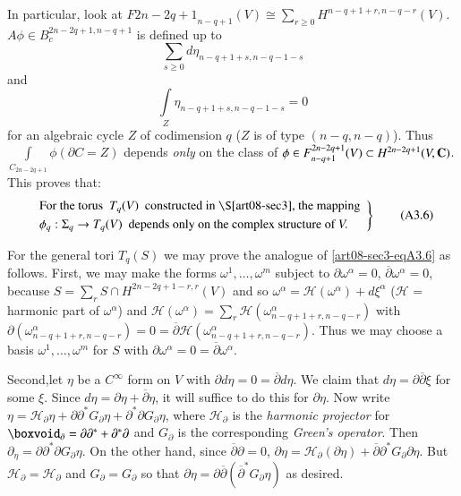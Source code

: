 In particular, look at $F{2n-2q+1}_{n-q+1}(V)\cong \sum\limits_{r\geq 0}H^{n-q+1+r,n-q-r}(V)$. $A\phi \in B^{2n-2q+1,n-q+1}_{c}$ is defined up to 
$$
\sum\limits_{s\geq 0}d\eta_{n-q+1+s,n-q-1-s}
$$ 
and 
$$
\int\limits_{Z}\eta_{n-q+1+s,n-q-1-s}=0
$$ 
for an algebraic cycle $Z$ of codimension $q$ ($Z$ is of type $(n-q,n-q)$). Thus $\int\limits_{C_{2n-2q+1}}\phi(\partial C=Z)$ depends {\em only} on the class of $\phi\in F^{2n-2q+1}_{n-q+1}(V)\subset H^{2n-2q+1}(V,\mathbf{C})$. This proves that:
\begin{equation*}
\left.
\begin{array}{l}
\text{For the torus~ } T_{q}(V)\text{~ constructed in \S\ref{art08-sec3}, the mapping}\\[3pt]
\phi_{q}:\Sigma_{q}\to T_{q}(V)\text{~ depends only on the complex structure of } V.
\end{array}\right\}\tag{A3.6}\label{art08-sec3-eqA3.6}
\end{equation*}

For the general tori $T_{q}(S)$ we may prove the analogue of \eqref{art08-sec3-eqA3.6} as follows. First, we may make the forms $\omega^{1},\ldots,\omega^{m}$ subject to $\partial \omega^{\alpha}=0$, $\overline{\partial}\omega^{\alpha}=0$, because $S=\sum\limits_{r}S\cap H^{2n-2q+1-r,r}(V)$ and so $\omega^{\alpha}=\mathscr{H}(\omega^{\alpha})+d\xi^{\alpha}$ ($\mathscr{H}$ = harmonic part of $\omega^{\alpha}$) and $\mathscr{H}(\omega^{\alpha})=\sum\limits_{r}\mathscr{H}(\omega^{\alpha}_{n-q+1+r,n-q-r})$ with $\partial (\omega^{\alpha}_{n-q+1+r,n-q-r})=0=\overline{\partial}\mathscr{H}(\omega^{\alpha}_{n-q+1+r,n-q-r})$. Thus we may choose a basis $\omega^{1},\ldots,\omega^{m}$ for $S$ with $\partial \omega^{\alpha}=0=\overline{\partial}\omega^{\alpha}$.

Second,\pageoriginale let $\eta$ be a $C^{\infty}$ form on $V$ with $\partial d\eta=0=\overline{\partial}d\eta$. We claim that $d\eta=\partial\overline{\partial}\xi$ for some $\xi$. Since $d\eta=\partial\eta+\overline{\partial}\eta$, it will suffice to do this for $\partial\eta$. Now write $\eta=\mathscr{H}_{\partial}\eta+\partial\partial^{*}G_{\partial}\eta+\partial^{*}\partial G_{\partial}\eta$, where $\mathscr{H}_{\partial}$ is the {\em harmonic projector} for $\boxvoid_{\partial}=\partial\partial^{*}+\partial^{*}\partial$ and $G_{\partial}$ is the corresponding {\em Green's operator}. Then $\partial_{\eta}=\partial\partial^{*}\partial G_{\partial}\eta$. On the other hand, since $\overline{\partial}\partial=0$, $\partial\eta=\mathscr{H}_{\partial}(\partial\eta)+\overline{\partial}\partial^{*}G_{\partial}\partial\eta$. But $\mathscr{H}_{\partial}=\mathscr{H}_{\partial}$ and $G_{\partial}=G_{\partial}$ so that $\partial\eta=\partial\overline{\partial}(\overline{\partial}^{*}G_{\partial}\eta)$ as desired.

